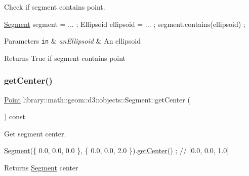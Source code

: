 Check if segment contains point. 


\begin{DoxyCode}
\hyperlink{classlibrary_1_1math_1_1geom_1_1d3_1_1objects_1_1_segment_a5562342d1edf2f52e37ce1bc138ee7d7}{Segment} segment = ... ;
Ellipsoid ellipsoid = ... ;
segment.contains(ellipsoid) ;
\end{DoxyCode}



\begin{DoxyParams}[1]{Parameters}
\mbox{\tt in}  & {\em an\+Ellipsoid} & An ellipsoid \\
\hline
\end{DoxyParams}
\begin{DoxyReturn}{Returns}
True if segment contains point 
\end{DoxyReturn}
\mbox{\label{classlibrary_1_1math_1_1geom_1_1d3_1_1objects_1_1_segment_a6788da2dd6ee48ded2da197c01ea7f3d}} 
\subsubsection{\texorpdfstring{get\+Center()}{getCenter()}}
{\footnotesize\ttfamily \hyperlink{classlibrary_1_1math_1_1geom_1_1d3_1_1objects_1_1_point}{Point} library\+::math\+::geom\+::d3\+::objects\+::\+Segment\+::get\+Center (\begin{DoxyParamCaption}{ }\end{DoxyParamCaption}) const}



Get segment center. 


\begin{DoxyCode}
\hyperlink{classlibrary_1_1math_1_1geom_1_1d3_1_1objects_1_1_segment_a5562342d1edf2f52e37ce1bc138ee7d7}{Segment}(\{ 0.0, 0.0, 0.0 \}, \{ 0.0, 0.0, 2.0 \}).\hyperlink{classlibrary_1_1math_1_1geom_1_1d3_1_1objects_1_1_segment_a6788da2dd6ee48ded2da197c01ea7f3d}{getCenter}() ; \textcolor{comment}{// [0.0, 0.0, 1.0]}
\end{DoxyCode}


\begin{DoxyReturn}{Returns}
\hyperlink{classlibrary_1_1math_1_1geom_1_1d3_1_1objects_1_1_segment}{Segment} center 
\end{DoxyReturn}
\mbox{\label{classlibrary_1_1math_1_1geom_1_1d3_1_1objects_1_1_segment_afc15a855d660d67e96467466c4442bbc}} 
